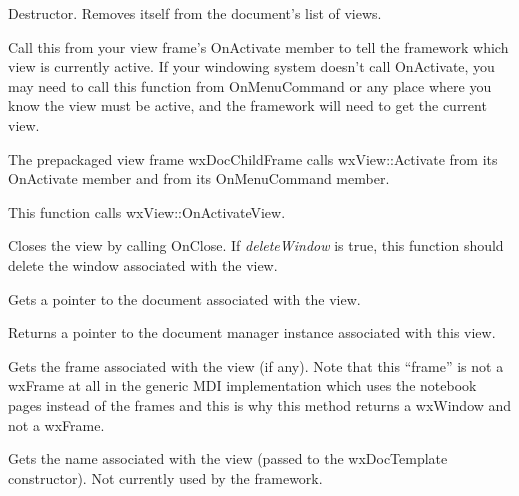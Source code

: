 Destructor. Removes itself from the document's list of views.



Call this from your view frame's OnActivate member to tell the framework which view is
currently active. If your windowing system doesn't call OnActivate, you may need to
call this function from OnMenuCommand or any place where you know the view must
be active, and the framework will need to get the current view.

The prepackaged view frame wxDocChildFrame calls wxView::Activate from its OnActivate member
and from its OnMenuCommand member.

This function calls wxView::OnActivateView.



Closes the view by calling OnClose. If {\it deleteWindow} is true, this function should
delete the window associated with the view.



Gets a pointer to the document associated with the view.



Returns a pointer to the document manager instance associated with this view.

\label{wxviewgetframe}


Gets the frame associated with the view (if any). Note that this ``frame'' is
not a wxFrame at all in the generic MDI implementation which uses the notebook
pages instead of the frames and this is why this method returns a wxWindow and
not a wxFrame.



Gets the name associated with the view (passed to the wxDocTemplate constructor).
Not currently used by the framework.


